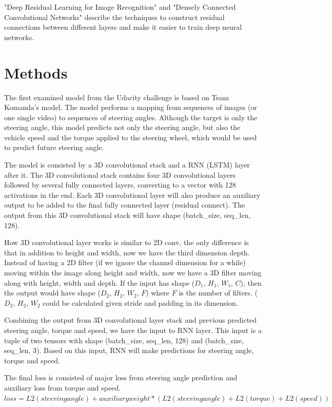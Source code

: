 \documentclass[10pt,twocolumn,letterpaper]{article}
\begin{document}
"Deep Residual Learning for Image Recognition" \cite{he2016deep} and "Densely Connected Convolutional Networks" \cite{huang2016densely} describe the techniques to construct residual connections between different layers and make it easier to train deep neural networks. 


\section{Methods}

The first examined model from the Udacity challenge is based on Team Komanda's model. The model performs a mapping from sequences of images (or one single video) to sequences of steering angles. Although the target is only the steering angle, this model predicts not only the steering angle, but also the vehicle speed and the torque applied to the steering wheel, which would be used to predict future steering angle. 

The model is consisted by a 3D convolutional stack and a RNN (LSTM) layer after it. The 3D convolutional stack contains four 3D convolutional layers followed by several fully connected layers, converting to a vector with 128 activations in the end. Each 3D convolutional layer will also produce an auxiliary output to be added to the final fully connected layer (residual connect). The output from this 3D convolutional stack will have shape (batch\_size, seq\_len, 128).

How 3D convolutional layer works is similar to 2D conv, the only difference is that in addition to height and width, now we have the third dimension depth. Instead of having a 2D filter (if we ignore the channel dimension for a while) moving within the image along height and width, now we have a 3D filter moving along with height, width and depth. If the input has shape ($D_{1}$, $H_{1}$,  $W_{1}$, $C$), then the output would have shape ($D_{2}$, $H_{2}$, $W_{2}$, $F$) where $F$ is the number of filters. ($D_{2}$, $H_{2}$, $W_{2}$ could be calculated given stride and padding in its dimension.

Combining the output from 3D convolutional layer stack and previous predicted steering angle, torque and speed, we have the input to RNN layer. This input is a tuple of two tensors with shape (batch\_size, seq\_len, 128) and (batch\_size, seq\_len, 3). Based on this input, RNN will make predictions for steering angle, torque and speed. 

The final loss is consisted of major loss from steering angle prediction and auxiliary loss from torque and speed. 
$loss=L2(steering angle)+auxiliary weight*(L2(steering angle)+L2(torque)+L2(speed))$
\end{document}
